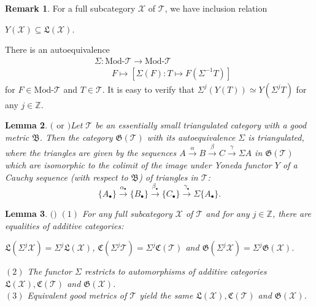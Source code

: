 \documentclass[11pt,a4paper]{amsart}
\numberwithin{equation}{section} \theoremstyle{plain}
\newtheorem{lem}{Lemma}[section]
\numberwithin{equation}{section} \theoremstyle{definition}
\newtheorem{rem}[lem]{Remark}
\newenvironment{rmk}{\begin{rem}\rm}{\end{rem}}
\begin{document}
\begin{rmk} For a full subcategory $\mathcal{X}$ of $\mathcal{T}$, we have inclusion relation
\begin{center}
$Y(\mathcal{X})\subseteq\mathfrak{L}(\mathcal{X})$.
\end{center}
\end{rmk}

There is an autoequivalence
\begin{align*}
&\Sigma:\text{Mod-}\mathcal{T}\rightarrow\text{Mod-}\mathcal{T}\\
&\qquad{F\mapsto[\Sigma(F):T\mapsto F(\Sigma^{-1}T)]}
\end{align*}
for $F\in\text{Mod-}\mathcal{T}$ and $T\in\mathcal{T}$. It is easy to verify that $\Sigma^{j}(Y(T))\simeq Y(\Sigma^{j}T)$ for any $j\in\mathbb{Z}$.

\begin{lem}$($\cite[Theorem 2.11]{N1} $\mathrm{or}$ \cite[Theorem 15]{N2}$)$\label{thm1}
Let $\mathcal{T}$ be an essentially small triangulated category with a good metric $\mathfrak{B}$. Then the category $\mathfrak{G}(\mathcal{T})$ with its autoequivalence $\Sigma$ is triangulated, where the triangles are given by the sequences $A\xrightarrow{\alpha} B\xrightarrow{\beta} C\xrightarrow{\gamma}\Sigma A$ in $\mathfrak{G}(\mathcal{T})$ which are isomorphic to the colimit of the image under Yoneda functor $Y$ of a Cauchy sequence (with respect to $\mathfrak{B}$) of triangles in $\mathcal{T}$:
$$\{A_{\bullet}\}\xrightarrow{\alpha_{\bullet}}\{B_{\bullet}\}\xrightarrow{\beta_{\bullet}}\{C_{\bullet}\}\xrightarrow{\gamma_{\bullet}}\Sigma\{A_{\bullet}\}.$$
\end{lem}

\begin{lem}$($\cite[Lemma 2.14]{BCRPZ}$)$
$(1)$ For any full subcategory $\mathcal{X}$ of $\mathcal{T}$ and for any $j\in\mathbb{Z}$, there are equalities of additive categories:
\begin{center}
$\mathfrak{L}(\Sigma^{j}\mathcal{X})=\Sigma^{j}\mathfrak{L}(\mathcal{X})$, $\mathfrak{C}(\Sigma^{j}\mathcal{T})=\Sigma^{j}\mathfrak{C}(\mathcal{T})$ and $\mathfrak{G}(\Sigma^{j}\mathcal{X})=\Sigma^{j}\mathfrak{G}(\mathcal{X})$.
\end{center}
$(2)$ The functor $\Sigma$ restricts to automorphisms of additive categories $\mathfrak{L}(\mathcal{X}),\mathfrak{C}(\mathcal{T})$ and $\mathfrak{G}(\mathcal{X})$.\\
$(3)$ Equivalent good metrics of $\mathcal{T}$ yield the same $\mathfrak{L}(\mathcal{X}),\mathfrak{C}(\mathcal{T})$ and $\mathfrak{G}(\mathcal{X})$.
\end{lem}
\end{document}
